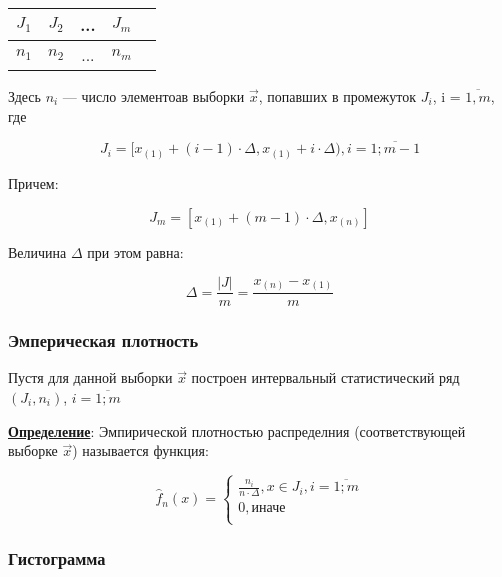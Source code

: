 \begin{table}[htb]
    \centering
    \begin{tabular}{|c|c|c|c|c|}
        \hline
        $J_1$ & $J_2$ & ... & $J_m$ \\
        \hline
        $n_1$ & $n_2$ & ... & $n_m$ \\
        \hline
    \end{tabular}
\end{table}

Здесь $n_i$ --- число элементоав выборки $\vec x$, попавших в промежуток $J_i$, i = $\overline{1, m}$, где

\begin{equation}
    J_i = [x_{(1)} + (i - 1) \cdot \Delta, x_{(1)} + i \cdot \Delta), i = \overline{1; m - 1}
\end{equation}

Причем:

\begin{equation}
    J_{m} = [x_{(1)} + (m - 1) \cdot \Delta, x_{(n)}]
\end{equation}

Величина $\Delta$ при этом равна:

\begin{equation}
    \Delta = \frac{|J|}{m} = \frac{x_{(n)} - x_{(1)}}{m}
\end{equation}


\subsubsection{Эмперическая плотность}

Пустя для данной выборки $\vec x$ построен интервальный статистический ряд $(J_i, n_i)$, $i = \overline{1; m}$\newline

\textbf{\underline{Определение}}: Эмпирической плотностью распределния (соответствующей выборке $\vec x$) называется функция:

\begin{equation}
    \hat f_n(x) =
    \begin{cases}
        \frac{n_i}{n \cdot \Delta}, x \in J_i, i = \overline{1; m} \\
        0, \text{иначе} \\
    \end{cases}
\end{equation}


\subsubsection{Гистограмма}

